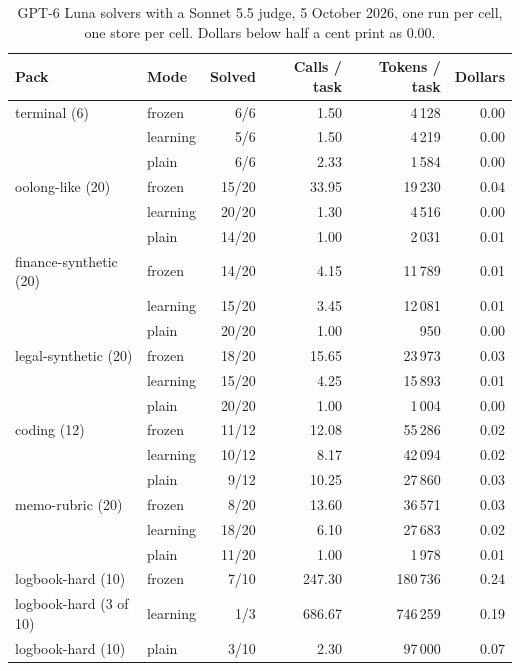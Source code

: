 \documentclass[11pt,a4paper]{article}
\begin{document}
\begin{table}[htbp]
\centering
\small
\begin{tabular}{@{}llrrrr@{}}
\toprule
Pack & Mode & Solved & Calls / task & Tokens / task & Dollars \\
\midrule
terminal (6)           & frozen   & 6/6   & 1.50   & 4\,128   & 0.00 \\
                       & learning & 5/6   & 1.50   & 4\,219   & 0.00 \\
                       & plain    & 6/6   & 2.33   & 1\,584   & 0.00 \\
\addlinespace
oolong-like (20)       & frozen   & 15/20 & 33.95  & 19\,230  & 0.04 \\
                       & learning & 20/20 & 1.30   & 4\,516   & 0.00 \\
                       & plain    & 14/20 & 1.00   & 2\,031   & 0.01 \\
\addlinespace
finance-synthetic (20) & frozen   & 14/20 & 4.15   & 11\,789  & 0.01 \\
                       & learning & 15/20 & 3.45   & 12\,081  & 0.01 \\
                       & plain    & 20/20 & 1.00   & 950      & 0.00 \\
\addlinespace
legal-synthetic (20)   & frozen   & 18/20 & 15.65  & 23\,973  & 0.03 \\
                       & learning & 15/20 & 4.25   & 15\,893  & 0.01 \\
                       & plain    & 20/20 & 1.00   & 1\,004   & 0.00 \\
\addlinespace
coding (12)            & frozen   & 11/12 & 12.08  & 55\,286  & 0.02 \\
                       & learning & 10/12 & 8.17   & 42\,094  & 0.02 \\
                       & plain    & 9/12  & 10.25  & 27\,860  & 0.03 \\
\addlinespace
memo-rubric (20)       & frozen   & 8/20  & 13.60  & 36\,571  & 0.03 \\
                       & learning & 18/20 & 6.10   & 27\,683  & 0.02 \\
                       & plain    & 11/20 & 1.00   & 1\,978   & 0.01 \\
\addlinespace
logbook-hard (10)      & frozen   & 7/10  & 247.30 & 180\,736 & 0.24 \\
logbook-hard (3 of 10) & learning & 1/3   & 686.67 & 746\,259 & 0.19 \\
logbook-hard (10)      & plain    & 3/10  & 2.30   & 97\,000  & 0.07 \\
\bottomrule
\end{tabular}
\caption{GPT-6 Luna solvers with a Sonnet 5.5 judge, 5 October 2026, one run
per cell, one store per cell. Dollars below half a cent print as 0.00.}
\label{tab:luna}
\end{table}
\end{document}
